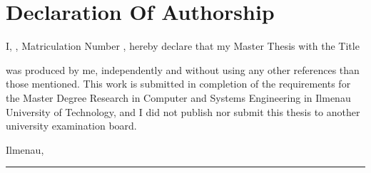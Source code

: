 \section*{Declaration Of Authorship}

\thispagestyle{empty}

\vspace{2cm}

\noindent I, \autor, Matriculation Number \matriculationnr, hereby declare that my Master Thesis with the Title
\begin{quote}
    \textit{\thesistopic}
\end{quote}
was produced by me, independently and without using any other references than those mentioned. This work is submitted in completion of the requirements for the Master Degree  Research in Computer and Systems Engineering in Ilmenau University of Technology, and I did not publish nor submit this thesis to another university examination board.

\vspace{6mm}
Ilmenau, \submissiondate

\vspace{10mm}
\rule[-0.2cm]{6cm}{0.5pt}

\textsc{\autor}